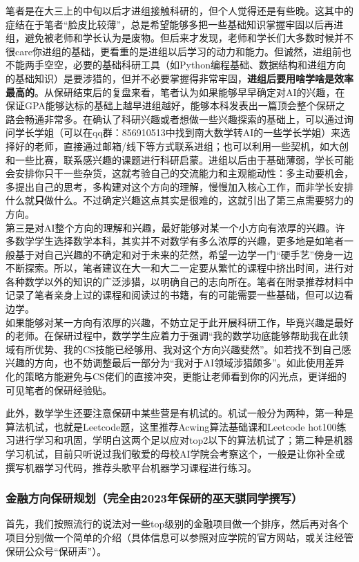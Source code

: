 \documentclass[a4paper,11pt,notitlepage]{article}
\newcommand{\empha}[1]{\textbf{#1}}
\begin{document}
\indent 笔者是在大三上的中旬以后才进组接触科研的，但个人觉得还是有些晚。这其中的症结在于笔者“脸皮比较薄”，总是希望能够多把一些基础知识掌握牢固以后再进组，避免被老师和学长认为是废物。但后来才发现，老师和学长们大多数时候并不很care你进组的基础，更看重的是进组以后学习的动力和能力。但诚然，进组前也不能两手空空，必要的基础科研工具（如Python编程基础、数据结构和进组方向的基础知识）是要涉猎的，但并不必要掌握得非常牢固，\empha{进组后要用啥学啥是效率最高的}。从保研结束后的复盘来看，笔者认为如果能够早早确定对AI的兴趣，在保证GPA能够达标的基础上越早进组越好，能够本科发表出一篇顶会整个保研之路会畅通非常多。在确认了科研兴趣或者想做一些兴趣探索的基础上，可以通过询问学长学姐（可以在qq群：856910513中找到南大数学转AI的一些学长学姐）来选择好的老师，直接通过邮箱/线下等方式联系进组；也可以利用一些契机，如大创和一些比赛，联系感兴趣的课题进行科研启蒙。进组以后由于基础薄弱，学长可能会安排你只干一些杂货，这就考验自己的交流能力和主观能动性：多主动要机会，多提出自己的思考，多构建对这个方向的理解，慢慢加入核心工作，而非学长安排什么就\empha{只}做什么。不过确定兴趣这点其实是很难的，这就引出了第三点需要努力的方向。\\
\indent 第三是对AI整个方向的理解和兴趣，最好能够对某一个小方向有浓厚的兴趣。许多数学学生选择数学本科，其实并不对数学有多么浓厚的兴趣，更多地是如笔者一般基于对自己兴趣的不确定和对于未来的茫然，希望一边学一门“硬手艺”傍身一边不断探索。所以，笔者建议在大一和大二一定要从繁忙的课程中挤出时间，进行对各种数学以外的知识的广泛涉猎，以明确自己的志向所在。笔者在附录推荐材料中记录了笔者亲身上过的课程和阅读过的书籍，有的可能需要一些基础，但可以边看边学。\\
\indent 如果能够对某一方向有浓厚的兴趣，不妨立足于此开展科研工作，毕竟兴趣是最好的老师。在保研过程中，数学学生应着力于强调“我的数学功底能够帮助我在此领域有所优势、我的CS技能已经够用、我对这个方向兴趣斐然”。如若找不到自己感兴趣的方向，也不妨调整最后一部分为“我对于AI领域涉猎颇多”。如此使用差异化的策略方能避免与CS佬们的直接冲突，更能让老师看到你的闪光点，更详细的可见笔者的保研经验贴\cite{笔者的保研经验贴}。

\indent 此外，数学学生还要注意保研中某些营是有机试的。机试一般分为两种，第一种是算法机试，也就是Leetcode题，这里推荐Acwing算法基础课和Leetcode hot100练习进行学习和巩固，学明白这两个足以应对top2以下的算法机试了；第二种是机器学习机试，目前只听说过我们敬爱的母校AI学院会考察这个，一般是让你补全或撰写机器学习代码，推荐头歌平台机器学习课程进行练习。

\subsubsection{金融方向保研规划（完全由2023年保研的巫天骐同学撰写）}
首先，我们按照流行的说法对一些top级别的金融项目做一个排序，然后再对各个项目分别做一个简单的介绍（具体信息可以参照对应学院的官方网站，或关注经管保研公众号“保研声”）。
\end{document}
